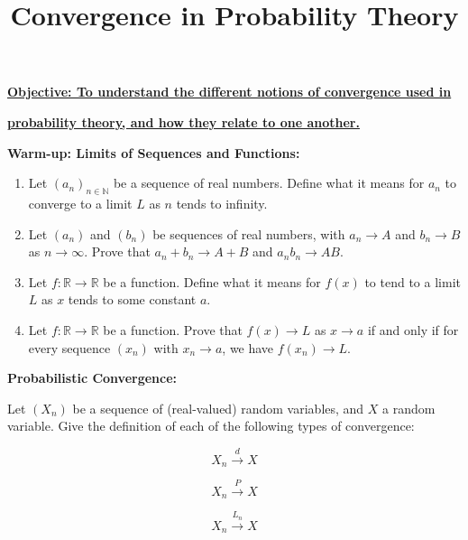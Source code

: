 \documentclass{article}
\begin{document}
\title{Convergence in Probability Theory}
\date{}

\maketitle
\thispagestyle{empty}

\Large

\vskip -10mm

\textbf{\underline{Objective: To understand the different notions of convergence used in}}

\textbf{\underline{probability theory, and how they relate to one another.}}


\vspace{5mm}




\textbf{Warm-up: Limits of Sequences and Functions:}\bigskip

\begin{enumerate}
	\item Let $(a_n)_{n\in\mathbb{N}}$ be a sequence of real numbers. Define what it means for $a_n$ to converge to a limit $L$ as $n$ tends to infinity.
	\item Let $(a_n)$ and $(b_n)$ be sequences of real numbers, with $a_n\to A$ and $b_n\to B$ as $n\to \infty$. Prove that $a_n+b_n\to A+B$ and $a_nb_n\to AB$.
	\item Let $f\colon\mathbb{R}\to\mathbb{R}$ be a function. Define what it means for $f(x)$ to tend to a limit $L$ as $x$ tends to some constant $a$.
	\item Let $f\colon\mathbb{R}\to\mathbb{R}$ be a function. Prove that $f(x)\to L$ as $x\to a$ if and only if for every sequence $(x_n)$ with $x_n\to a$, we have $f(x_n)\to L$.
\end{enumerate}

\clearpage



\textbf{Probabilistic Convergence:}\bigskip

Let $(X_n)$ be a sequence of (real-valued) random variables, and $X$ a random variable. Give the definition of each of the following types of convergence:\bigskip

\[X_n\xrightarrow{d} X\]

\vfill


\[X_n\xrightarrow{P} X\]

\vfill

\[X_n\xrightarrow{L_n}X\]


\vfill

\clearpage
\end{document}
